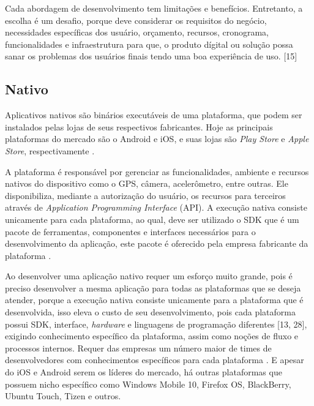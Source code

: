 Cada abordagem de desenvolvimento tem limitações e benefícios. Entretanto, a escolha é um desafio, porque deve considerar os requisitos do negócio, necessidades específicas dos usuário, orçamento, recursos, cronograma, funcionalidades e infraestrutura para que, o produto dígital ou solução possa sanar os problemas dos usuários finais tendo uma boa experiência de uso. [15]

\subsection{\esp Nativo}

Aplicativos nativos são binários executáveis de uma plataforma, que podem ser instalados pelas lojas de seus respectivos fabricantes. Hoje as principais plataformas do mercado são o Android e iOS, e suas lojas são \textit{Play Store} e \textit{Apple Store}, respectivamente \cite{14-ibm}.

A plataforma é responsável por gerenciar as funcionalidades, ambiente e recursos nativos do dispositivo como o GPS, câmera, acelerômetro, entre outras. Ele disponibiliza, mediante a autorização do usuário, os recursos para terceiros através de \textit{Application Programming Interface} (API). A execução nativa consiste unicamente para cada plataforma, ao qual, deve ser utilizado o SDK que é um pacote de ferramentas, componentes e interfaces necessários para o desenvolvimento da aplicação, este pacote é oferecido pela empresa fabricante da plataforma \cite{14-ibm}.

Ao desenvolver uma aplicação nativo requer um esforço muito grande, pois é preciso desenvolver a mesma aplicação para todas as plataformas que se deseja atender, porque a execução nativa consiste unicamente para a plataforma que é desenvolvida, isso eleva o custo de seu desenvolvimento, pois cada plataforma possui SDK, interface, \textit{hardware} e linguagens de programação diferentes \cite{14-ibm}[13, 28], exigindo conhecimento específico da plataforma, assim como noções de fluxo e processos internos. Requer das empresas um número maior de times de desenvolvedores com conhecimentos específicos para cada plataforma \cite{14-ibm}. E apesar do iOS e Android serem os líderes do mercado, há outras plataformas que possuem nicho específico como Windows Mobile 10, Firefox OS, BlackBerry, Ubuntu Touch, Tizen e outros.

